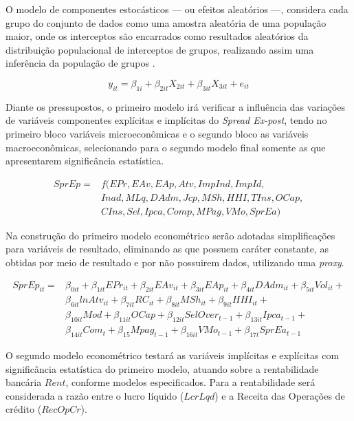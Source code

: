 \documentclass[
  12pt,
  12pt,
  openright,
  oneside,
  a4paper,
  chapter=TITLE,
  section=TITLE,
  subsection=TITLE,
  subsubsection=TITLE,
  english,
  portugues,
  sumario=tradicional]{abntex2}
\begin{document}
O modelo de componentes estocásticos --- ou efeitos aleatórios ---, considera cada grupo do conjunto de dados como uma amostra aleatória de uma população maior, onde os interceptos são encarrados como resultados aleatórios da distribuição populacional de interceptos de grupos, realizando assim uma inferência da população de grupos \cite{hill:2010}.

\begin{equation}
y_{it} = \beta_{1i} + \beta_{2it}X_{2it} + \beta_{3it}X_{3it} + e_{it}
\end{equation}

Diante os pressupostos, o primeiro modelo irá verificar a influência das variações de variáveis componentes explícitas e implícitas do \emph{Spread Ex-post}, tendo no primeiro bloco variáveis microeconômicas e o segundo bloco as variáveis macroeconômicas, selecionando para o segundo modelo final somente as que apresentarem significância estatística.

\begin{equation}
\begin{aligned}
SprEp = &f(EPr, EAv, EAp, Atv, ImpInd, ImpId, \\ 
& Inad, MLq, DAdm, Jcp, MSh, HHI, TIns, OCap, \\ 
& CIns, Sel, Ipca, Comp, MPag, VMo, SprEa)
\end{aligned}
\end{equation}

Na construção do primeiro modelo econométrico serão adotadas simplificações para variáveis de resultado, eliminando as que possuem caráter constante, as obtidas por meio de resultado e por não possuirem dados, utilizando uma \emph{proxy}.

\begin{equation}
\begin{aligned}
SprEp_{it} = & \beta_{0it} + \beta_{1it}EPr_{it} + \beta_{2it}EAv_{it} + \beta_{3it}EAp_{it} + \beta_{4it}DAdm_{it} + \beta_{5it}Vol_{it} + \\
& \beta_{6it}lnAtv_{it} + \beta_{7it}RC_{it} + \beta_{8it}MSh_{it} + \beta_{9it}HHI_{it} + \\ 
& \beta_{10it}Mod + \beta_{11it}OCap + \beta_{12it}SelOver_{t-1} + \beta_{13it}Ipca_{t-1} + \\
& \beta_{14it}Com_{t} + \beta_{15}Mpag_{t-1} + \beta_{16it}VMo_{t-1} +  \beta_{17t}SprEa_{t-1}
\end{aligned}
\end{equation}

O segundo modelo econométrico testará as variáveis implícitas e explícitas com significância estatística do primeiro modelo, atuando sobre a rentabilidade bancária \(Rent\), conforme modelos especificados. Para a rentabilidade será considerada a razão entre o lucro líquido (\(LcrLqd\)) e a Receita das Operações de crédito (\(RecOpCr\)).
\end{document}
